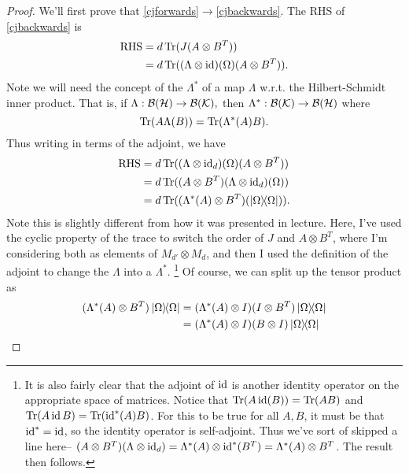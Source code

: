 \begin{proof}
    We'll first prove that \ref{cjforwards}$\to$\ref{cjbackwards}. The RHS of \ref{cjbackwards} is
    \begin{align*}
        \text{RHS}&=d\operatorname{Tr} (J(A\otimes B^T))\\
        &= d\operatorname{Tr}((\Lambda\otimes \operatorname{id})(\Omega)(A\otimes B^T)).
    \end{align*}
    Note we will need the concept of the  $\Lambda^*$ of a map $\Lambda$ w.r.t. the Hilbert-Schmidt inner product. That is, if $\Lambda:\mathcal{B}(\mathcal H)\to \mathcal{B}(\mathcal{K}),$ then $\Lambda^*:\mathcal{B}(\mathcal{K})\to \mathcal{B}(\mathcal H)$ where
    \begin{equation}
        \operatorname{Tr}(A\Lambda(B)) = \operatorname{Tr} (\Lambda^*(A) B).
    \end{equation}
    Thus writing in terms of the adjoint, we have
    \begin{align*}
        \text{RHS}&=d\operatorname{Tr}((\Lambda\otimes \operatorname{id}_d)(\Omega)(A\otimes B^T))\\
        &= d\operatorname{Tr}((A\otimes B^T)(\Lambda\otimes \operatorname{id}_d) (\Omega))\\
        &= d\operatorname{Tr}((\Lambda^*(A)\otimes B^T)(\left\lvert{\Omega}\middle\rangle\!\middle\langle{\Omega}\right\rvert)).
    \end{align*}
    Note this is slightly different from how it was presented in lecture. Here, I've used the cyclic property of the trace to switch the order of $J$ and $A\otimes B^T$, where I'm considering both as elements of $M_{d'}\otimes M_d$, and then I used the definition of the adjoint to change the $\Lambda$ into a $\Lambda^*$.%
        \footnote{It is also fairly clear that the adjoint of $\operatorname{id}$ is another identity operator on the appropriate space of matrices. Notice that $\operatorname{Tr}(A \operatorname{id} (B))=\operatorname{Tr}(AB)$ and $\operatorname{Tr}(A\operatorname{id} B)=\operatorname{Tr}(\operatorname{id}^*(A) B)$. For this to be true for all $A,B$, it must be that $\operatorname{id}^*=\operatorname{id}$, so the identity operator is self-adjoint. Thus we've sort of skipped a line here-- $(A\otimes B^T)(\Lambda\otimes \operatorname{id}_d)=\Lambda^*(A) \otimes \operatorname{id}^*(B^T)=\Lambda^*(A) \otimes B^T$. The result then follows.}
    Of course, we can split up the tensor product as
    \begin{align*}
        (\Lambda^*(A)\otimes B^T)\dyad{\Omega} &= (\Lambda^*(A) \otimes I)(I\otimes B^T)\dyad{\Omega}\\
        &= (\Lambda^*(A)\otimes I)(B\otimes I)\dyad{\Omega}\\

\end{align*}
\end{proof}
